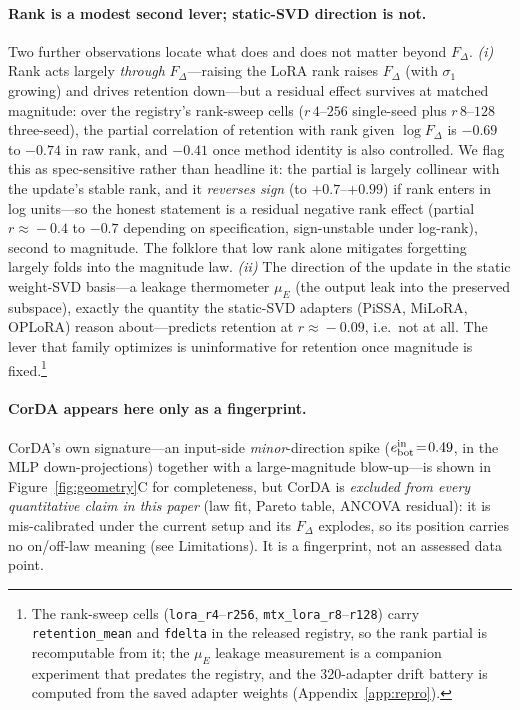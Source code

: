 \documentclass[11pt]{article}
\newcommand{\dw}{F_{\Delta}}
\begin{document}
\paragraph{Rank is a modest second lever; static-SVD direction is not.} Two further
observations locate what does and does not matter beyond $\dw$. \emph{(i)} Rank acts
largely \emph{through} $\dw$---raising the LoRA rank raises $\dw$ (with $\sigma_1$
growing) and drives retention down---but a residual effect survives at matched
magnitude: over the registry's rank-sweep cells ($r\,4$--$256$ single-seed
plus $r\,8$--$128$ three-seed), the partial correlation of retention with rank
given $\log\dw$ is $-0.69$ to $-0.74$ in raw rank, and $-0.41$ once method
identity is also controlled. We flag this as spec-sensitive rather than headline
it: the partial is largely collinear with the update's stable rank, and it
\emph{reverses sign} (to $+0.7$--$+0.99$) if rank enters in log units---so the
honest statement is a residual negative rank effect (partial
$r\!\approx\!-0.4$ to $-0.7$ depending on specification, sign-unstable under
log-rank), second to magnitude.
The folklore that low rank alone mitigates forgetting
largely folds into the magnitude law. \emph{(ii)} The direction of the update in the
static weight-SVD basis---a leakage thermometer $\mu_E$ (the output leak into the
preserved subspace), exactly the quantity the static-SVD adapters (PiSSA, MiLoRA,
OPLoRA) reason about---predicts retention at $r\!\approx\!-0.09$, i.e.\ not at all.
The lever that family optimizes is uninformative for retention once magnitude is
fixed.\footnote{The rank-sweep cells (\texttt{lora\_r4}--\texttt{r256},
\texttt{mtx\_lora\_r8}--\texttt{r128}) carry \texttt{retention\_mean} and
\texttt{fdelta} in the released registry, so the rank partial is recomputable
from it; the $\mu_E$ leakage measurement is a companion experiment that predates
the registry, and the 320-adapter drift battery is
computed from the saved adapter weights (Appendix~\ref{app:repro}).}

\paragraph{CorDA appears here only as a fingerprint.} CorDA's own signature---an
input-side \emph{minor}-direction spike ($e^{\rm in}_{\rm bot}\!=\!0.49$, in the MLP
down-projections) together with a large-magnitude blow-up---is shown in
Figure~\ref{fig:geometry}C for completeness, but CorDA is \emph{excluded from every
quantitative claim in this paper} (law fit, Pareto table, ANCOVA residual): it is
mis-calibrated under the current setup and its $\dw$ explodes, so its position
carries no on/off-law meaning (see Limitations). It is a fingerprint, not an
assessed data point.
\end{document}
